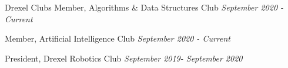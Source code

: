 
\begin{cvskills}

  \cvskill
  {Drexel Clubs}
  {Member, Algorithms \& Data Structures Club \hfill \textit{September 2020 - Current}}

  \cvskill
  {}
  {Member, Artificial Intelligence Club \hfill \textit{September 2020 - Current}}
  
  \cvskill
  {}
  {President, Drexel Robotics Club \hfill \textit{September 2019- September 2020}}
\end{cvskills}